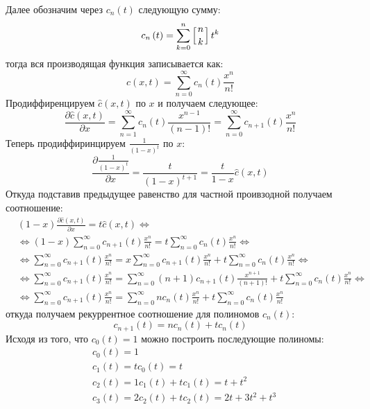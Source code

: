 Далее обозначим через $c_n\left(t\right)$ следующую сумму:
\[
	c_n\left(t\right) = \sum_{k=0}^{n} \left[n\atop k\right] t^k
\]
тогда вся производящая функция записывается как:
\[
	\hat c\left(x,t\right) = \sum_{n=0}^{\infty} c_n\left(t\right) \frac{x^n}{n!}
\]
Продиффиренцируем $\hat c\left(x,t\right)$ по $x$ и получаем следующее:
\[
	\frac{\partial \hat c \left(x,t\right)}{\partial x} = \sum_{n=1}^{\infty} c_n\left(t\right) \frac{x^{n-1}}{\left(n-1\right)!} = \sum_{n=0}^{\infty} c_{n+1}\left(t\right) \frac{x^n}{n!}
\]
Теперь продиффиринцируем $\frac{1}{\left(1-x\right)^t}$ по $x$:
\[
	\frac{\partial \frac{1}{\left(1-x\right)^t}}{\partial x} = \frac{t}{\left(1-x\right)^{t+1}} = \frac{t}{1-x} \hat c\left(x,t\right)
\]
Откуда подставив предыдущее равенство для частной проивзодной получаем соотношение:
\[
	\begin{split}
		& \left(1-x\right) \frac{\partial \hat c\left(x,t\right)}{\partial x} = t\hat c\left(x,t\right) \Leftrightarrow\\
		& \Leftrightarrow \left(1-x\right)\sum_{n=0}^{\infty} c_{n+1}\left(t\right) \frac{x^n}{n!} = t\sum_{n=0}^{\infty}c_n\left(t\right)\frac{x^n}{n!} \Leftrightarrow\\
		& \Leftrightarrow \sum_{n=0}^{\infty}c_{n+1}\left(t\right) \frac{x^n}{n!} = x\sum_{n=0}^{\infty} c_{n+1}\left(t\right)\frac{x^n}{n!} + t \sum_{n=0}^{\infty}c_n\left(t\right)\frac{x^n}{n!} \Leftrightarrow\\
		& \Leftrightarrow \sum_{n=0}^{\infty}c_{n+1}\left(t\right) \frac{x^n}{n!} = \sum_{n=0}^{\infty} \left(n+1\right) c_{n+1}\left(t\right) \frac{x^{n+1}}{\left(n+1\right)!} + t \sum_{n=0}^{\infty} c_n\left(t\right) \frac{x^n}{n!} \Leftrightarrow\\
		& \Leftrightarrow \sum_{n=0}^{\infty}c_{n+1}\left(t\right) \frac{x^n}{n!} = \sum_{n=0}^{\infty} n c_n\left(t\right)\frac{x^n}{n!} + t\sum_{n=0}^{\infty} c_n\left(t\right) \frac{x^n}{n!}
	\end{split}
\]
откуда получаем рекуррентное соотношение для полиномов $c_n\left(t\right)$:
\[
	c_{n+1}\left(t\right) = n c_n\left(t\right) + t c_n\left(t\right)
\]
Исходя из того, что $c_0\left(t\right) = 1$ можно построить последующие полиномы:
\[
	\begin{split}
		& c_0\left(t\right) = 1\\
		& c_1\left(t\right) = t c_0\left(t\right) = t\\
		& c_2\left(t\right) = 1 c_1\left(t\right) + t c_1\left(t\right) = t + t^2\\
		& c_3\left(t\right) = 2 c_2\left(t\right) + t c_2\left(t\right) = 2 t + 3 t^2 + t^3
	\end{split}
\]


